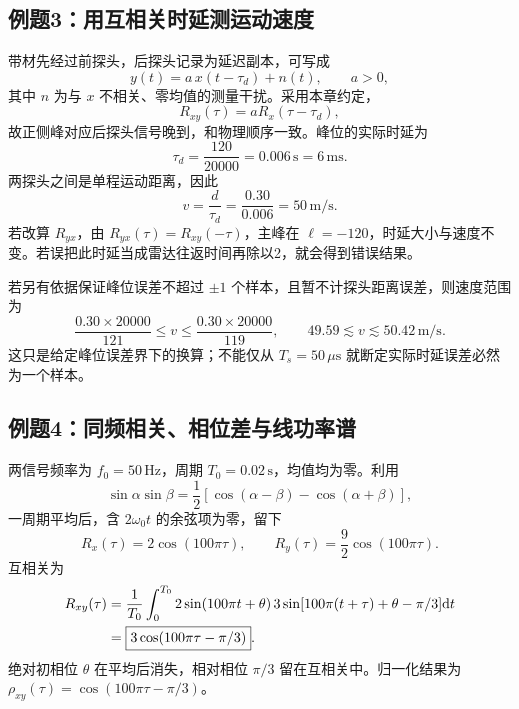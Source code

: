 \Needspace{8cm}
\subsection{例题3：用互相关时延测运动速度}


\sol
带材先经过前探头，后探头记录为延迟副本，可写成
\[
y(t)=a\,x(t-\tau_d)+n(t),\qquad a>0,
\]
其中 $n$ 为与 $x$ 不相关、零均值的测量干扰。采用本章约定，
\[
R_{xy}(\tau)=aR_x(\tau-\tau_d),
\]
故正侧峰对应后探头信号晚到，和物理顺序一致。峰位的实际时延为
\[
\boxed{\tau_d=\frac{120}{20000}=0.006\,\mathrm s=6\,\mathrm{ms}}.
\]
两探头之间是单程运动距离，因此
\[
\boxed{v=\frac{d}{\tau_d}=\frac{0.30}{0.006}=50\,\mathrm{m/s}}.
\]
若改算 $R_{yx}$，由 $R_{yx}(\tau)=R_{xy}(-\tau)$，主峰在 $\ell=-120$，时延大小与速度不变。若误把此时延当成雷达往返时间再除以2，就会得到错误结果。

若另有依据保证峰位误差不超过 $\pm1$ 个样本，且暂不计探头距离误差，则速度范围为
\[
\frac{0.30\times20000}{121}\leq v\leq
\frac{0.30\times20000}{119},
\qquad \boxed{49.59\lesssim v\lesssim50.42\,\mathrm{m/s}}.
\]
这只是给定峰位误差界下的换算；不能仅从 $T_s=50\,\mu\mathrm s$ 就断定实际时延误差必然为一个样本。


\Needspace{8cm}
\subsection{例题4：同频相关、相位差与线功率谱}


\sol
两信号频率为 $f_0=50\,\mathrm{Hz}$，周期 $T_0=0.02\,\mathrm s$，均值均为零。利用
\[
\sin\alpha\sin\beta=\frac12[\cos(\alpha-\beta)-\cos(\alpha+\beta)],
\]
一周期平均后，含 $2\omega_0t$ 的余弦项为零，留下
\[
\boxed{R_x(\tau)=2\cos(100\pi\tau)},\qquad
\boxed{R_y(\tau)=\frac92\cos(100\pi\tau)}.
\]
互相关为
\begin{align*}
R_{xy}(\tau)
&=\frac1{T_0}\int_0^{T_0}2\sin(100\pi t+\theta)
\,3\sin[100\pi(t+\tau)+\theta-\pi/3]\mathrm{d} t\\
&=\boxed{3\cos(100\pi\tau-\pi/3)}.
\end{align*}
绝对初相位 $\theta$ 在平均后消失，相对相位 $\pi/3$ 留在互相关中。归一化结果为 $\rho_{xy}(\tau)=\cos(100\pi\tau-\pi/3)$。


